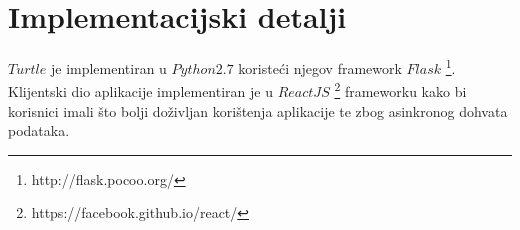 \newpage

\section{Implementacijski detalji}

$Turtle$ je implementiran u $Python 2.7$ koristeći njegov framework $Flask$ \footnote{http://flask.pocoo.org/}. Klijentski dio aplikacije implementiran je u $ReactJS$ \footnote{https://facebook.github.io/react/} frameworku kako bi korisnici imali što bolji doživljan korištenja aplikacije te zbog asinkronog dohvata podataka.